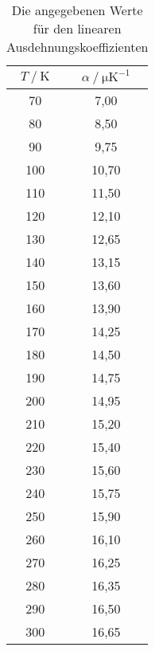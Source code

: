 \begin{table}[H] 
   \centering 
   \caption{Die angegebenen Werte für den linearen Ausdehnungskoeffizienten} 
   \label{tab:alpha} 
   \begin{tabular} { c c } 
 \toprule 
 {$T\:/\: \mathrm{K}$} & {$\alpha\:/\: \mathrm{\mu K^{-1}}$} \\ 
    \midrule 
    70 & 7,00 \\ 
    80 & 8,50 \\ 
    90 & 9,75 \\ 
    100 & 10,70 \\ 
    110 & 11,50 \\ 
    120 & 12,10 \\ 
    130 & 12,65 \\ 
    140 & 13,15 \\ 
    150 & 13,60 \\ 
    160 & 13,90 \\ 
    170 & 14,25 \\ 
    180 & 14,50 \\ 
    190 & 14,75 \\ 
    200 & 14,95 \\ 
    210 & 15,20 \\ 
    220 & 15,40 \\ 
    230 & 15,60 \\ 
    240 & 15,75 \\ 
    250 & 15,90 \\ 
    260 & 16,10 \\ 
    270 & 16,25 \\ 
    280 & 16,35 \\ 
    290 & 16,50 \\ 
    300 & 16,65 \\ 
    \bottomrule 
  \end{tabular}
\end{table}